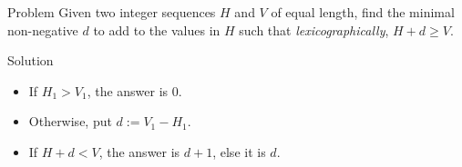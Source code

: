 \begin{slide}
	\begin{block}{Problem}
    Given two integer sequences $H$ and $V$ of equal length,
    find the minimal non-negative $d$ to add to the values in $H$
    such that \emph{lexicographically}, $H+d \ge V$.
	\end{block}
	\pause
	\begin{block}{Solution}
		\begin{itemize}
			\item If $H_1 > V_1$, the answer is $0$.
			\item Otherwise, put $d := V_1 - H_1$.
      \item If $H+d < V$, the answer is $d+1$, else it is $d$.
		\end{itemize}
	\end{block}
\end{slide}
